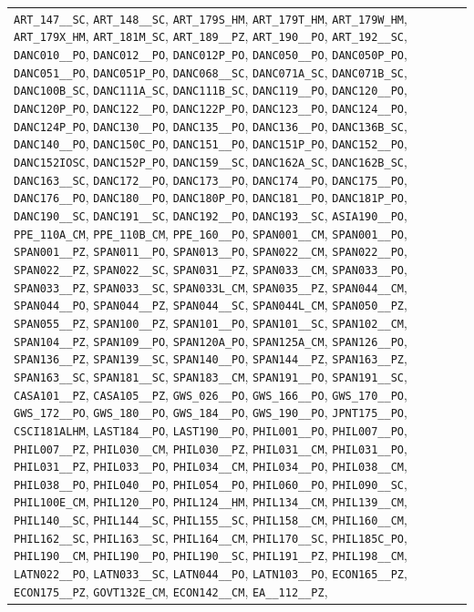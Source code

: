 \begin{longtable}{|p{4.4in}|p{4.4in}|}
\verb|ART_147__SC|, \verb|ART_148__SC|, \verb|ART_179S_HM|, \verb|ART_179T_HM|, \verb|ART_179W_HM|, \verb|ART_179X_HM|, \verb|ART_181M_SC|, \verb|ART_189__PZ|, \verb|ART_190__PO|, \verb|ART_192__SC|, \verb|DANC010__PO|, \verb|DANC012__PO|, \verb|DANC012P_PO|, \verb|DANC050__PO|, \verb|DANC050P_PO|, \verb|DANC051__PO|, \verb|DANC051P_PO|, \verb|DANC068__SC|, \verb|DANC071A_SC|, \verb|DANC071B_SC|, \verb|DANC100B_SC|, \verb|DANC111A_SC|, \verb|DANC111B_SC|, \verb|DANC119__PO|, \verb|DANC120__PO|, \verb|DANC120P_PO|, \verb|DANC122__PO|, \verb|DANC122P_PO|, \verb|DANC123__PO|, \verb|DANC124__PO|, \verb|DANC124P_PO|, \verb|DANC130__PO|, \verb|DANC135__PO|, \verb|DANC136__PO|, \verb|DANC136B_SC|, \verb|DANC140__PO|, \verb|DANC150C_PO|, \verb|DANC151__PO|, \verb|DANC151P_PO|, \verb|DANC152__PO|, \verb|DANC152IOSC|, \verb|DANC152P_PO|, \verb|DANC159__SC|, \verb|DANC162A_SC|, \verb|DANC162B_SC|, \verb|DANC163__SC|, \verb|DANC172__PO|, \verb|DANC173__PO|, \verb|DANC174__PO|, \verb|DANC175__PO|, \verb|DANC176__PO|, \verb|DANC180__PO|, \verb|DANC180P_PO|, \verb|DANC181__PO|, \verb|DANC181P_PO|, \verb|DANC190__SC|, \verb|DANC191__SC|, \verb|DANC192__PO|, \verb|DANC193__SC|, \verb|ASIA190__PO|, \verb|PPE_110A_CM|, \verb|PPE_110B_CM|, \verb|PPE_160__PO|, \verb|SPAN001__CM|, \verb|SPAN001__PO|, \verb|SPAN001__PZ|, \verb|SPAN011__PO|, \verb|SPAN013__PO|, \verb|SPAN022__CM|, \verb|SPAN022__PO|, \verb|SPAN022__PZ|, \verb|SPAN022__SC|, \verb|SPAN031__PZ|, \verb|SPAN033__CM|, \verb|SPAN033__PO|, \verb|SPAN033__PZ|, \verb|SPAN033__SC|, \verb|SPAN033L_CM|, \verb|SPAN035__PZ|, \verb|SPAN044__CM|, \verb|SPAN044__PO|, \verb|SPAN044__PZ|, \verb|SPAN044__SC|, \verb|SPAN044L_CM|, \verb|SPAN050__PZ|, \verb|SPAN055__PZ|, \verb|SPAN100__PZ|, \verb|SPAN101__PO|, \verb|SPAN101__SC|, \verb|SPAN102__CM|, \verb|SPAN104__PZ|, \verb|SPAN109__PO|, \verb|SPAN120A_PO|, \verb|SPAN125A_CM|, \verb|SPAN126__PO|, \verb|SPAN136__PZ|, \verb|SPAN139__SC|, \verb|SPAN140__PO|, \verb|SPAN144__PZ|, \verb|SPAN163__PZ|, \verb|SPAN163__SC|, \verb|SPAN181__SC|, \verb|SPAN183__CM|, \verb|SPAN191__PO|, \verb|SPAN191__SC|, \verb|CASA101__PZ|, \verb|CASA105__PZ|, \verb|GWS_026__PO|, \verb|GWS_166__PO|, \verb|GWS_170__PO|, \verb|GWS_172__PO|, \verb|GWS_180__PO|, \verb|GWS_184__PO|, \verb|GWS_190__PO|, \verb|JPNT175__PO|, \verb|CSCI181ALHM|, \verb|LAST184__PO|, \verb|LAST190__PO|, \verb|PHIL001__PO|, \verb|PHIL007__PO|, \verb|PHIL007__PZ|, \verb|PHIL030__CM|, \verb|PHIL030__PZ|, \verb|PHIL031__CM|, \verb|PHIL031__PO|, \verb|PHIL031__PZ|, \verb|PHIL033__PO|, \verb|PHIL034__CM|, \verb|PHIL034__PO|, \verb|PHIL038__CM|, \verb|PHIL038__PO|, \verb|PHIL040__PO|, \verb|PHIL054__PO|, \verb|PHIL060__PO|, \verb|PHIL090__SC|, \verb|PHIL100E_CM|, \verb|PHIL120__PO|, \verb|PHIL124__HM|, \verb|PHIL134__CM|, \verb|PHIL139__CM|, \verb|PHIL140__SC|, \verb|PHIL144__SC|, \verb|PHIL155__SC|, \verb|PHIL158__CM|, \verb|PHIL160__CM|, \verb|PHIL162__SC|, \verb|PHIL163__SC|, \verb|PHIL164__CM|, \verb|PHIL170__SC|, \verb|PHIL185C_PO|, \verb|PHIL190__CM|, \verb|PHIL190__PO|, \verb|PHIL190__SC|, \verb|PHIL191__PZ|, \verb|PHIL198__CM|, \verb|LATN022__PO|, \verb|LATN033__SC|, \verb|LATN044__PO|, \verb|LATN103__PO|, \verb|ECON165__PZ|, \verb|ECON175__PZ|, \verb|GOVT132E_CM|, \verb|ECON142__CM|, \verb|EA__112__PZ|, 
\end{longtable}
